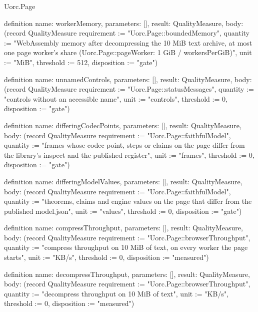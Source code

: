 \begin{lexlean}{Uorc.Page}
\begin{semanticmodule}
definition{
  name: workerMemory,
  parameters: [],
  result: QualityMeasure,
  body: (record QualityMeasure {requirement := "Uorc.Page::boundedMemory", quantity := "WebAssembly memory after decompressing the 10 MiB text archive, at most one page worker's share (Uorc.Page::pageWorker: 1 GiB / workersPerGiB)", unit := "MiB", threshold := 512, disposition := "gate"})
}

definition{
  name: unnamedControls,
  parameters: [],
  result: QualityMeasure,
  body: (record QualityMeasure {requirement := "Uorc.Page::statusMessages", quantity := "controls without an accessible name", unit := "controls", threshold := 0, disposition := "gate"})
}

definition{
  name: differingCodecPoints,
  parameters: [],
  result: QualityMeasure,
  body: (record QualityMeasure {requirement := "Uorc.Page::faithfulModel", quantity := "frames whose codec point, steps or claims on the page differ from the library's inspect and the published register", unit := "frames", threshold := 0, disposition := "gate"})
}

definition{
  name: differingModelValues,
  parameters: [],
  result: QualityMeasure,
  body: (record QualityMeasure {requirement := "Uorc.Page::faithfulModel", quantity := "theorems, claims and engine values on the page that differ from the published model.json", unit := "values", threshold := 0, disposition := "gate"})
}

definition{
  name: compressThroughput,
  parameters: [],
  result: QualityMeasure,
  body: (record QualityMeasure {requirement := "Uorc.Page::browserThroughput", quantity := "compress throughput on 10 MiB of text, on every worker the page starts", unit := "KB/s", threshold := 0, disposition := "measured"})
}

definition{
  name: decompressThroughput,
  parameters: [],
  result: QualityMeasure,
  body: (record QualityMeasure {requirement := "Uorc.Page::browserThroughput", quantity := "decompress throughput on 10 MiB of text", unit := "KB/s", threshold := 0, disposition := "measured"})
}
\end{semanticmodule}
\end{lexlean}
